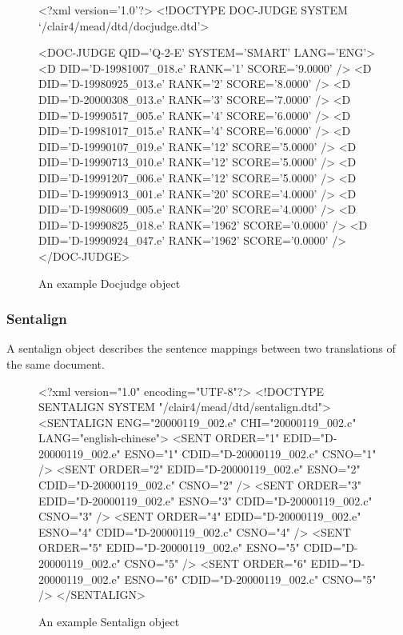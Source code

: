 \documentclass[10pt]{article}
\begin{document}
\begin{figure}[htp!]
\centering
\scriptsize
\begin{boxedverbatim}
<?xml version='1.0'?>
<!DOCTYPE DOC-JUDGE SYSTEM `/clair4/mead/dtd/docjudge.dtd'>

<DOC-JUDGE QID='Q-2-E' SYSTEM='SMART' LANG='ENG'>
    <D DID='D-19981007_018.e' RANK='1' SCORE='9.0000' />
    <D DID='D-19980925_013.e' RANK='2' SCORE='8.0000' />
    <D DID='D-20000308_013.e' RANK='3' SCORE='7.0000' />
    <D DID='D-19990517_005.e' RANK='4' SCORE='6.0000' />
    <D DID='D-19981017_015.e' RANK='4' SCORE='6.0000' />
    <D DID='D-19990107_019.e' RANK='12' SCORE='5.0000' />
    <D DID='D-19990713_010.e' RANK='12' SCORE='5.0000' />
    <D DID='D-19991207_006.e' RANK='12' SCORE='5.0000' />
    <D DID='D-19990913_001.e' RANK='20' SCORE='4.0000' />
    <D DID='D-19980609_005.e' RANK='20' SCORE='4.0000' />
    <D DID='D-19990825_018.e' RANK='1962' SCORE='0.0000' />
    <D DID='D-19990924_047.e' RANK='1962' SCORE='0.0000' />
</DOC-JUDGE>
\end{boxedverbatim}
\caption{An example Docjudge object}
\end{figure}



\subsubsection {Sentalign}

A sentalign object describes the sentence mappings between two
translations of the same document.

\begin{figure}[htp!]
\centering
\scriptsize
\begin{boxedverbatim}
<?xml version="1.0" encoding="UTF-8"?>
<!DOCTYPE SENTALIGN SYSTEM "/clair4/mead/dtd/sentalign.dtd">
<SENTALIGN ENG="20000119_002.e" CHI="20000119_002.c" LANG="english-chinese">
<SENT ORDER="1" EDID="D-20000119_002.e" ESNO="1" CDID="D-20000119_002.c"
CSNO="1" />
<SENT ORDER="2" EDID="D-20000119_002.e" ESNO="2" CDID="D-20000119_002.c"
CSNO="2" />
<SENT ORDER="3" EDID="D-20000119_002.e" ESNO="3" CDID="D-20000119_002.c"
CSNO="3" />
<SENT ORDER="4" EDID="D-20000119_002.e" ESNO="4" CDID="D-20000119_002.c"
CSNO="4" />
<SENT ORDER="5" EDID="D-20000119_002.e" ESNO="5" CDID="D-20000119_002.c"
CSNO="5" />
<SENT ORDER="6" EDID="D-20000119_002.e" ESNO="6" CDID="D-20000119_002.c"
CSNO="5" />
</SENTALIGN>
\end{boxedverbatim}
\caption {An example Sentalign object}
\end{figure}
\end{document}

